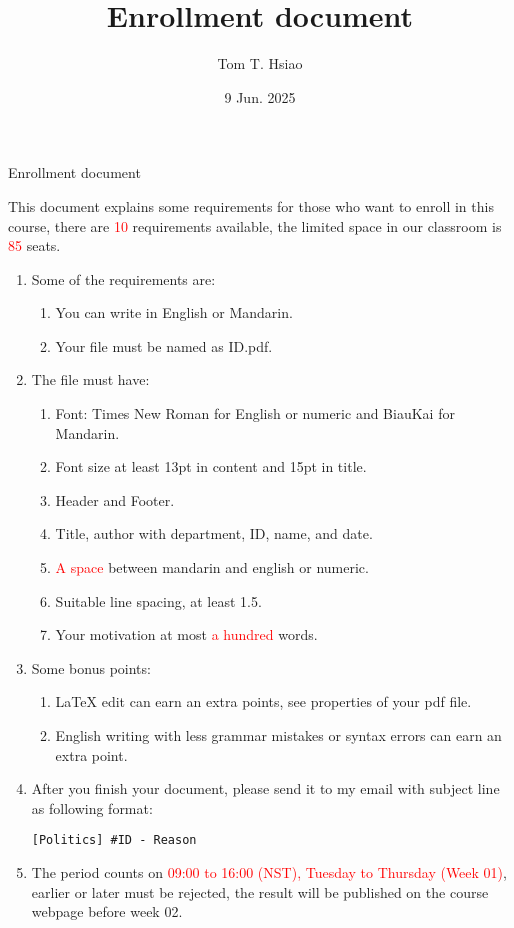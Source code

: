 \documentclass{article}
\title{Enrollment document}
\author{Tom T. Hsiao}
\date{9 Jun. 2025}
\begin{document}
\thispagestyle{fancy}
\begin{center}
\fontsize{16pt}{16pt}\selectfont Enrollment document
\end{center}
\fontsize{14pt}{14pt}\selectfont
This document explains some requirements for those who want to enroll in this course, there are \textcolor{red}{10} requirements available, the limited space in our classroom is \textcolor{red}{85} seats. \\
\begin{enumerate}
\item Some of the requirements are:
\begin{enumerate}
\item You can write in English or Mandarin.
\item Your file must be named as ID.pdf.
\end{enumerate}
\item The file must have:
\begin{enumerate}
\item Font: Times New Roman for English or numeric and BiauKai for Mandarin.
\item Font size at least 13pt in content and 15pt in title.
\item Header and Footer.
\item Title, author with department, ID, name, and date.
\item \textcolor{red}{A space} between mandarin and english or numeric.
\item Suitable line spacing, at least 1.5.
\item Your motivation at most \textcolor{red}{a hundred} words.
\end{enumerate}
\item Some bonus points:
\begin{enumerate}
\item LaTeX edit can earn an extra points, see properties of your pdf file.
\item English writing with less grammar mistakes or syntax errors can earn an extra point.
\end{enumerate}
\item After you finish your document, please send it to my email with subject line as following format:
\begin{verbatim}
[Politics] #ID - Reason
\end{verbatim}
\item The period counts on \textcolor{red}{09:00 to 16:00 (NST), Tuesday to Thursday (Week 01)}, earlier or later must be rejected, the result will be published on the course webpage before week 02.
\end{enumerate}
\end{document}
